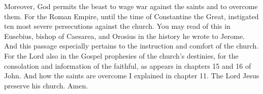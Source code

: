 Moreover, God permits the beast to wage war against the saints and to overcome them. For the Roman Empire, until the time of Constantine the Great, instigated ten most severe persecutions against the church. You may read of this in Eusebius, bishop of Caesarea, and Orosius in the history he wrote to Jerome. And this passage especially pertains to the instruction and comfort of the church. For the Lord also in the Gospel prophesies of the church’s destinies, for the consolation and information of the faithful, as appears in chapters 15 and 16 of John. And how the saints are overcome I explained in chapter 11. The Lord Jesus preserve his church. Amen.
